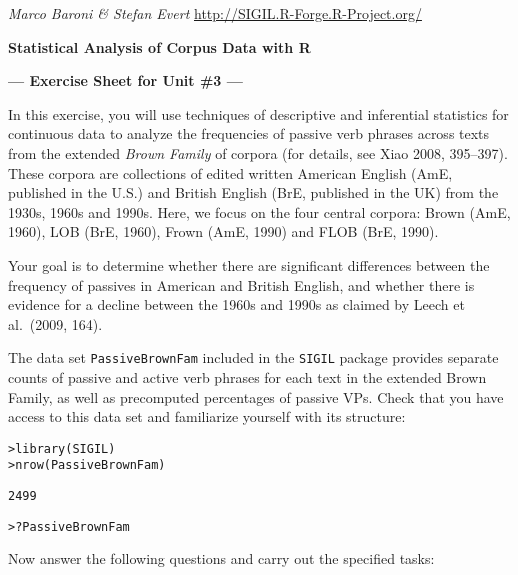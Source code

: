 \documentclass[a4paper,12pt]{article}
\begin{document}
\emph{Marco Baroni \& Stefan Evert} \hfill %
{\small \url{http://SIGIL.R-Forge.R-Project.org/}}

\begin{center}
  \textbf{\large Statistical Analysis of Corpus Data with R}

  \textbf{\large --- Exercise Sheet for Unit \#3 ---}
\end{center}

In this exercise, you will use techniques of descriptive and inferential statistics for continuous data to analyze the frequencies of passive verb phrases across texts from the extended \emph{Brown Family} of corpora (for details, see Xiao 2008, 395--397).  These corpora are collections of edited written American English (AmE, published in the U.S.) and British English (BrE, published in the UK) from the 1930s, 1960s and 1990s.  Here, we focus on the four central corpora: Brown (AmE, 1960), LOB (BrE, 1960), Frown (AmE, 1990) and FLOB (BrE, 1990).

Your goal is to determine whether there are significant differences between the frequency of passives in American and British English, and whether there is evidence for a decline between the 1960s and 1990s as claimed by Leech et al.\ (2009, 164).

The data set \texttt{PassiveBrownFam} included in the \texttt{SIGIL} package provides separate counts of passive and active verb phrases for each text in the extended Brown Family, as well as precomputed percentages of passive VPs.  Check that you have access to this data set and familiarize yourself with its structure:

\begin{alltt}
    > library(SIGIL)
    > nrow(PassiveBrownFam)  \begin{Rout}
    [1] 2499 \end{Rout}
    > ?PassiveBrownFam       
\end{alltt}

Now answer the following questions and carry out the specified tasks:
\end{document}
